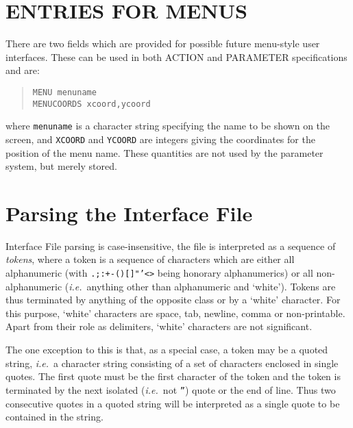\documentclass[twoside,11pt]{article}
\newcommand{\xlabel}[1]{}
\renewcommand{\_}{\texttt{\symbol{95}}}
\begin{document}
\section{ENTRIES FOR MENUS\xlabel{entries_for_menus}}

There are two fields which are provided for possible future 
menu-style user interfaces. These can be used in both ACTION and 
PARAMETER specifications and are:
\begin{quote} \begin{verbatim}
MENU menuname
MENUCOORDS xcoord,ycoord
\end{verbatim} \end{quote}
where \texttt{menuname} is a character string specifying the name to be shown on
the screen, and \texttt{XCOORD} and \texttt{YCOORD} are integers giving the 
coordinates for the position of the menu name. 
These quantities are not used by the parameter system, but merely stored. 

\appendix
\newpage

\section{Parsing the Interface File\xlabel{parsing_the_interface_file}
\label{parsing}}

Interface File parsing is case-insensitive, the file is
interpreted as a sequence of {\em tokens}, where a token is a sequence of
characters which are either all alphanumeric (with \texttt{.;:+-()\_[]"'<>} being
honorary alphanumerics) or all non-alphanumeric ({\em i.e.}\ anything other
than alphanumeric and `white'). 
Tokens are thus terminated by anything of the opposite class or by a `white'
character. 
For this purpose, `white' characters are space, tab, newline, comma or 
non-printable.
Apart from their role as delimiters, `white' characters are not significant.

The one exception to this is that, as a special case, a token may be a
quoted string, {\em i.e.}\ a character string consisting of a set of characters
enclosed in single quotes. 
The first quote must be the first
character of the token and the token is terminated by the next isolated
({\em i.e.}\ not \texttt{''}) quote or the end of line.
Thus two consecutive quotes in a quoted string will be interpreted as a single
quote to be contained in the string.
\end{document}
